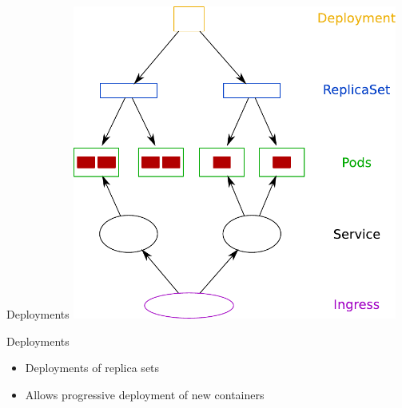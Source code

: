 \documentclass{dcpresentation}
\begin{document}
 
 \begin{frame}{Deployments}
  \centering
  \includegraphics[width=0.8\textwidth]{img/arch-psird.pdf}
 \end{frame}

 \begin{frame}{Deployments}
  \begin{itemize}
   \item Deployments of replica sets
   \item Allows progressive deployment of new containers
  \end{itemize}
 \end{frame}
 
\end{document}
